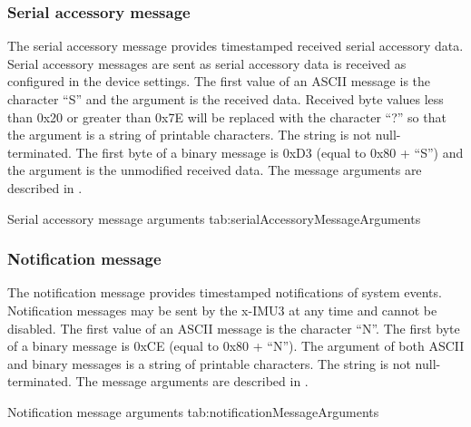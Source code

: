 \subsubsection{Serial accessory message}

The serial accessory message provides timestamped received serial accessory data.  Serial accessory messages are sent as serial accessory data is received as configured in the device settings.  The first value of an \ac{ASCII} message is the character \enquote{S} and the argument is the received data.  Received byte values less than 0x20 or greater than 0x7E will be replaced with the character \enquote{?} so that the argument is a string of printable characters.  The string is not null-terminated.  The first byte of a binary message is 0xD3 (equal to 0x80 + \enquote{S}) and the argument is the unmodified received data.  The message arguments are described in .

\begingroup
    \def\tempArgumentA{Received serial accessory data}
    \dataMessageTable
    {Serial accessory message arguments}
    {tab:serialAccessoryMessageArguments}
\endgroup

\begingroup
    \def\tempNameA{Data}
    \def\tempValueA{0x61 0x62 0x63 0x31 0x32 0x33 0xF1 0xF2 0xF3}
    \def\tempAsciiFirst{S}
    \def\tempAsciiA{abc123???}
    \def\tempBinaryFirst{D3}
    \def\tempBinaryA{61 62 63 31 32 33 F1 F2 F3}
    \dataMessageExample
\endgroup

\subsubsection{Notification message}

The notification message provides timestamped notifications of system events.  Notification messages may be sent by the x-IMU3 at any time and cannot be disabled.  The first value of an \ac{ASCII} message is the character \enquote{N}.  The first byte of a binary message is 0xCE (equal to 0x80 + \enquote{N}).  The argument of both \ac{ASCII} and binary messages is a string of printable characters.  The string is not null-terminated.  The message arguments are described in .

\begingroup
    \def\tempArgumentA{Notification string}
    \dataMessageTable
    {Notification message arguments}
    {tab:notificationMessageArguments}
\endgroup

\begingroup
    \def\tempNameA{String}
    \def\tempValueA{Button pressed.}
    \def\tempAsciiFirst{N}
    \def\tempAsciiA{Button pressed.}
    \def\tempBinaryFirst{CE}
    \def\tempBinaryA{42 75 74 74 6F 6E 20 70 72 65 73 73 65 64 2E}
    \dataMessageExample
\endgroup

